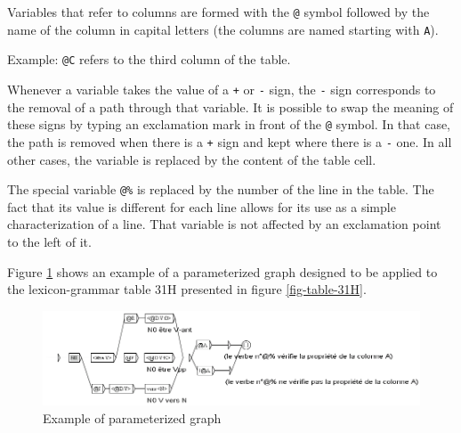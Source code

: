 \bigskip
\noindent Variables that refer to columns are formed with the \verb+@+ symbol
 followed by the name of the column in capital letters (the
columns are named starting with \verb+A+).

\bigskip
\noindent Example: \verb+@C+ refers to the third column of the table.

\bigskip
\noindent Whenever a variable takes the value of a \verb$+$ or \verb+-+ sign, the
\verb+-+ sign corresponds to the removal of a path through that variable. It is
possible to swap the meaning of these signs by typing an exclamation mark in
front of the \verb+@+ symbol. In that case, the path is removed when there is a
\verb$+$ sign and kept where there is a \verb+-+ one. In all other cases, the
variable is replaced by the content of the table cell.

\bigskip
\noindent The special variable \verb+@%+  is replaced by the
number of the line in the table. The fact that its value is different for each
line allows for its use as a simple characterization of a line. That variable is
not affected by an exclamation point to the left of it.

\bigskip
\noindent Figure \ref{fig-reference-graph} shows an example of a parameterized
graph designed to be applied to the lexicon-grammar table 31H presented in figure
\ref{fig-table-31H}.

\begin{figure}[!ht]
\begin{center}
\includegraphics[width=15cm]{resources/img/fig8-3.png}
\caption{Example of parameterized graph\label{fig-reference-graph}}
\end{center}
\end{figure}

